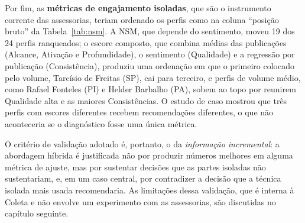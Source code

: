 Por fim, as \textbf{métricas de engajamento isoladas}, que são o instrumento corrente das assessorias, teriam ordenado os perfis como na coluna ``posição bruto'' da Tabela~\ref{tab:nsm}. A NSM, que depende do sentimento, moveu 19 dos 24 perfis ranqueados; o escore composto, que combina médias das publicações (Alcance, Ativação e Profundidade), o sentimento (Qualidade) e a regressão por publicação (Consistência), produziu uma ordenação em que o primeiro colocado pelo volume, Tarcísio de Freitas (SP), cai para terceiro, e perfis de volume médio, como Rafael Fonteles (PI) e Helder Barbalho (PA), sobem ao topo por reunirem Qualidade alta e as maiores Consistências. O estudo de caso mostrou que três perfis com escores diferentes recebem recomendações diferentes, o que não aconteceria se o diagnóstico fosse uma única métrica.

O critério de validação adotado é, portanto, o da \emph{informação incremental}: a abordagem híbrida é justificada não por produzir números melhores em alguma métrica de ajuste, mas por sustentar decisões que as partes isoladas não sustentariam, e, em um caso central, por contradizer a decisão que a técnica isolada mais usada recomendaria. As limitações dessa validação, que é interna à Coleta e não envolve um experimento com as assessorias, são discutidas no capítulo seguinte.

